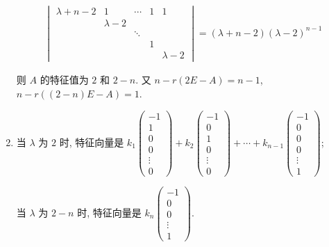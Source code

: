 \begin{enumerate}
\begin{align*}
\begin{vmatrix}
                           \lambda+n-2 & 1         & \cdots & 1 & 1         \\
                                       & \lambda-2 &        &   &           \\
                                       &           & \ddots &   &           \\
                                       &           &        & 1 &           \\
                                       &           &        &   & \lambda-2
                       \end{vmatrix}
                       =
                       (\lambda + n - 2)(\lambda - 2)^{n-1}
                   \end{align*}

                   则 \( A \) 的特征值为 \( 2 \) 和 \( 2-n \). 又 \( n - r(2E - A) = n - 1 \), \( n - r((2-n)E - A) = 1 \).
             \item %
                   当 \( \lambda \) 为 \( 2 \) 时, 特征向量是 \( k_{1}\begin{pmatrix}
                       -1     \\
                       1      \\
                       0      \\
                       0      \\
                       \vdots \\
                       0
                   \end{pmatrix} + k_{2}\begin{pmatrix}
                       -1     \\
                       0      \\
                       1      \\
                       0      \\
                       \vdots \\
                       0
                   \end{pmatrix} + \cdots + k_{n-1}\begin{pmatrix}
                       -1     \\
                       0      \\
                       0      \\
                       0      \\
                       \vdots \\
                       1
                   \end{pmatrix} \);

                   当 \( \lambda \) 为 \( 2-n \) 时, 特征向量是 \( k_{n}\begin{pmatrix}
                       -1     \\
                       0      \\
                       0      \\
                       \vdots \\
                       1
                   \end{pmatrix} \).
         \end{enumerate}


